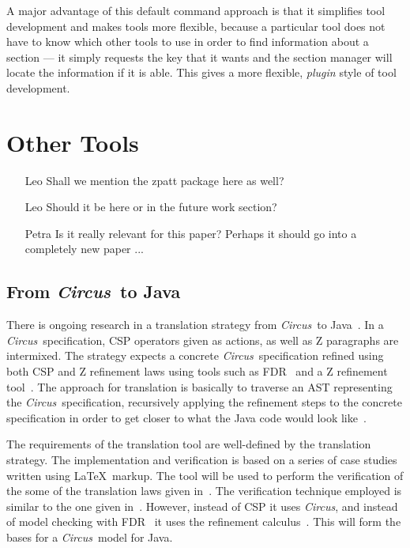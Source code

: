 \documentclass{llncs}
\newcommand{\Circus}{{\sf\slshape Circus}}
\begin{document}
  A major advantage of this default command approach is that it simplifies
  tool development and makes tools more flexible, because a particular
  tool does not have to know which other tools to use in order to
  find information about a section --- it simply requests the key that
  it wants and the section manager will locate the information if it is able.
  This gives a more flexible, \emph{plugin} style of tool development.


\section{Other Tools}
\label{other-tools}

\begin{itemize}
   \item[Leo] Shall we mention the zpatt package here as well?
   \item[Leo] Should it be here or in the future work section?
   \item[Petra] Is it really relevant for this paper?  Perhaps it
     should go into a completely new paper ...
\end{itemize}

\subsection{From \Circus\ to Java}

There is ongoing research in a translation strategy from \Circus\ to
Java~\cite{angela-2005}.  In a \Circus\ specification, CSP operators
given as actions, as well as Z paragraphs are intermixed.  The
strategy expects a concrete \Circus\ specification refined using both
CSP and Z refinement laws using tools such as
FDR~\cite{csp.tools:fdrm} and a Z refinement tool~\cite{angela-2003}.
The approach for translation is basically to traverse an AST
representing the \Circus\ specification, recursively applying the
refinement steps to the concrete specification in order to get closer
to what the Java code would look like~\cite{marcel-2004}.

The requirements of the translation tool are well-defined by the
translation strategy.  The implementation and verification is based on
a series of case studies written using \LaTeX\ markup.  The tool will
be used to perform the verification of the some of the translation
laws given in~\cite{marcel-2004}.  The verification technique employed
is similar to the one given in~\cite{welch-martin2000}.  However,
instead of CSP it uses \Circus, and instead of model checking with
FDR~\cite{csp.tools:fdrm} it uses the refinement
calculus~\cite{fm.ref:morgan}.  This will form the bases for a
\Circus\ model for Java.
\end{document}
